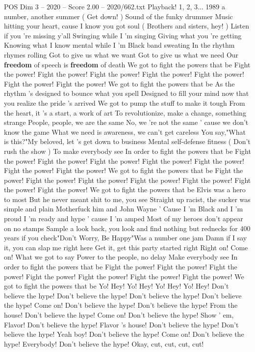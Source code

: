 \begin{textsample}{POS Dim 3 – 2020 – Score 2.00 – 2020/662.txt}  \label{ex:f3_pos_002}
Playback! 1, 2, 3... 1989 a number, another summer ( Get down! ) Sound of the funky drummer Music hitting your heart, cause I know you got soul ( Brothers and sisters, hey! ) Listen if you 're missing y'all Swinging while I 'm singing Giving what you 're getting Knowing what I know mental while I 'm Black band sweating In the rhythm rhymes rolling Got to give us what we want Got to give us what we need Our \textbf{freedom} of speech is \textbf{freedom} of death We got to fight the powers that be Fight the power!
Fight the power!
Fight the power!
Fight the power!
Fight the power!
Fight the power!
Fight the power!
We got to fight the powers that be As the rhythm 's designed to bounce what you spell Designed to fill your mind now that you realize the pride 's arrived We got to pump the stuff to make it tough From the heart, it 's a start, a work of art To revolutionize, make a change, something strange People, people, we are the same No, we 're not the same ' cause we don't know the game What we need is awareness, we can't get careless You say,"What is this?"My beloved, let 's get down to business Mental self-defense fitness ( Don't rush the show ) To make everybody see In order to fight the powers that be Fight the power!
Fight the power!
Fight the power!
Fight the power!
Fight the power!
Fight the power!
Fight the power!
We got to fight the powers that be Fight the power!
Fight the power!
Fight the power!
Fight the power!
Fight the power!
Fight the power!
Fight the power!
We got to fight the powers that be Elvis was a hero to most But he never meant shit to me, you see Straight up racist, the sucker was simple and plain Motherfuck him and John Wayne ' Cause I 'm Black and I 'm proud I 'm ready and hype ' cause I 'm amped Most of my heroes don't appear on no stamps Sample a look back, you look and find nothing but rednecks for 400 years if you check"Don't Worry, Be Happy"Was a number one jam Damn if I say it, you can slap me right here Get it, get this party started right Right on!
Come on!
What we got to say Power to the people, no delay Make everybody see In order to fight the powers that be Fight the power!
Fight the power!
Fight the power!
Fight the power!
Fight the power!
Fight the power!
Fight the power!
We got to fight the powers that be Yo!
Hey!
Yo!
Hey!
Yo!
Hey!
Yo!
Hey!
Don't believe the hype!
Don't believe the hype!
Don't believe the hype!
Don't believe the hype!
Come on!
Don't believe the hype!
Don't believe the hype!
From the house!
Don't believe the hype!
Come on!
Don't believe the hype!
Show ' em, Flavor!
Don't believe the hype!
Flavor 's house!
Don't believe the hype!
Don't believe the hype!
Yeah boy!
Don't believe the hype!
Come on!
Don't believe the hype!
Everybody!
Don't believe the hype!
Okay, cut, cut, cut, cut!

\end{textsample}
